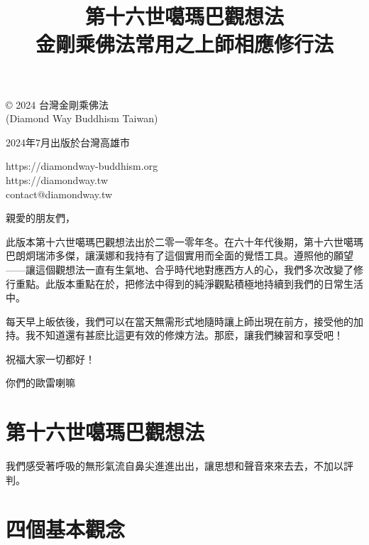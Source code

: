 \documentclass[a6paper,10pt]{ctexbook}
\title{\textbf{第十六世噶瑪巴觀想法} \\[6pt] \large 金剛乘佛法常用之上師相應修行法}
\date{}
\begin{document}
\color{black}
\maketitle

\vspace*{\fill}
{
  \small\sffamily\noindent\copyright{} 2024 台灣金剛乘佛法\\ (Diamond Way Buddhism Taiwan)

\noindent 2024年7月出版於台灣高雄市

\noindent https://diamondway-buddhism.org\\
https://diamondway.tw\\
contact@diamondway.tw
}

\cleardoublepage
\vspace*{3ex}
親愛的朋友們，

此版本第十六世噶瑪巴觀想法出於二零一零年冬。在六十年代後期，第十六世噶瑪巴朗炯瑞沛多傑，讓漢娜和我持有了這個實用而全面的覺悟工具。遵照他的願望——讓這個觀想法一直有生氣地、合乎時代地對應西方人的心，我們多次改變了修行重點。此版本重點在於，把修法中得到的純淨觀點積極地持續到我們的日常生活中。

每天早上皈依後，我們可以在當天無需形式地隨時讓上師出現在前方，接受他的加持。我不知道還有甚麽比這更有效的修煉方法。那麽，讓我們練習和享受吧！

\noindent%

祝福大家一切都好！

你們的歐雷喇嘛

\cleardoublepage
\section*{第十六世噶瑪巴觀想法}

我們感受著呼吸的無形氣流自鼻尖進進出出，讓思想和聲音來來去去，不加以評判。
\vspace{-3ex}

\section*{四個基本觀念}
\end{document}
